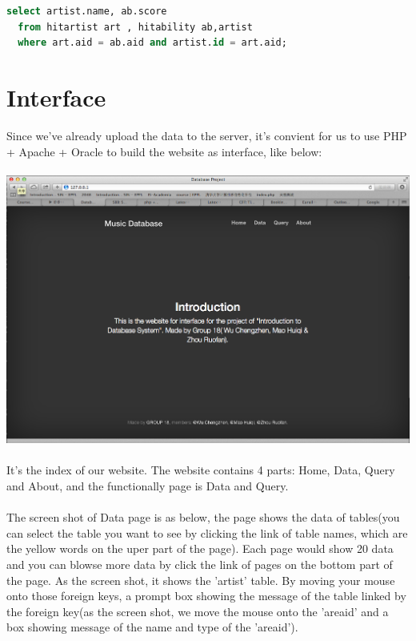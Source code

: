 \documentclass[11pt]{article} %
\begin{document}
{\begin{lstlisting}[language=SQL, keywordstyle=\color{blue!70},
commentstyle=\color{red!50!green!50!blue!50},
rulesepcolor=\color{red!20!green!20!blue!20},
frame=shadowbox]
select artist.name, ab.score
  from hitartist art , hitability ab,artist
  where art.aid = ab.aid and artist.id = art.aid;

\end{lstlisting}

\section{Interface}
Since we've already upload the data to the server, it's convient for us to use PHP + Apache + Oracle to build the website as interface, like below:\\ \\
\includegraphics[width=14cm]{interface1}\\ \\
It's the index of our website. The website contains 4 parts: Home, Data, Query and About, and the functionally page is Data and Query.\\ \\
The screen shot of Data page is as below, the page shows the data of tables(you can select the table you want to see by clicking the link of table names, which are the yellow words on the uper part of the page). Each page would show 20 data and you can blowse more data by click the link of pages on the bottom part of the page. As the screen shot, it shows the 'artist' table. By moving your mouse onto those foreign keys, a prompt box showing the message of the table linked by the foreign key(as the screen shot, we move the mouse onto the 'areaid' and a box showing message of the name and type of the 'areaid').\\ \\
}
\end{document}
